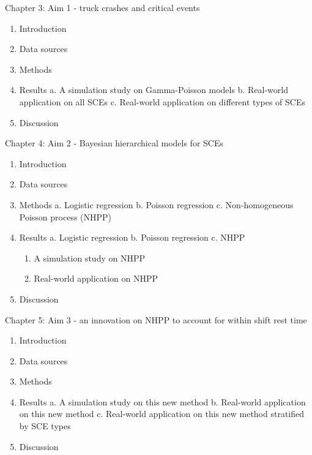 \documentclass[12pt]{book}
\numberwithin{equation}{chapter}
\providecommand{\tightlist}{%
  \setlength{\itemsep}{0pt}\setlength{\parskip}{0pt}}
\begin{document}
Chapter 3: Aim 1 - truck crashes and critical events

\begin{enumerate}
\def\labelenumi{\arabic{enumi}.}
\tightlist
\item
  Introduction
\item
  Data sources
\item
  Methods
\item
  Results
  a. A simulation study on Gamma-Poisson models
  b. Real-world application on all SCEs
  c. Real-world application on different types of SCEs
\item
  Discussion
\end{enumerate}

Chapter 4: Aim 2 - Bayesian hierarchical models for SCEs

\begin{enumerate}
\def\labelenumi{\arabic{enumi}.}
\tightlist
\item
  Introduction
\item
  Data sources
\item
  Methods
  a. Logistic regression
  b. Poisson regression
  c. Non-homogeneous Poisson process (NHPP)
\item
  Results
  a. Logistic regression
  b. Poisson regression
  c. NHPP

  \begin{enumerate}
  \def\labelenumii{\roman{enumii}.}
  \tightlist
  \item
    A simulation study on NHPP
  \item
    Real-world application on NHPP
  \end{enumerate}
\item
  Discussion
\end{enumerate}

Chapter 5: Aim 3 - an innovation on NHPP to account for within shift rest time

\begin{enumerate}
\def\labelenumi{\arabic{enumi}.}
\tightlist
\item
  Introduction
\item
  Data sources
\item
  Methods
\item
  Results
  a. A simulation study on this new method
  b. Real-world application on this new method
  c. Real-world application on this new method stratified by SCE types
\item
  Discussion
\end{enumerate}
\end{document}
